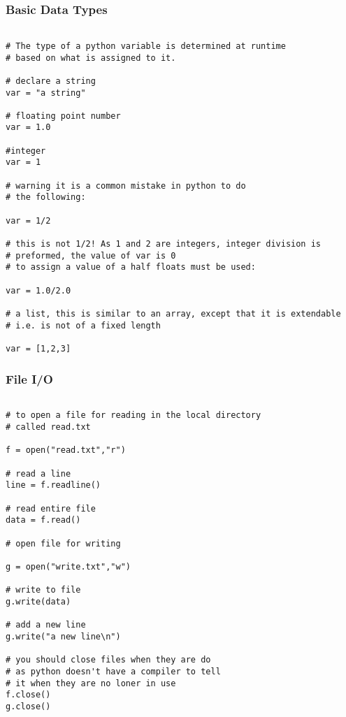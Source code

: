\documentclass[11pt,a4paper]{article}
\begin{document}
\subsubsection{Basic Data Types}
\begin{verbatim}

# The type of a python variable is determined at runtime
# based on what is assigned to it.

# declare a string
var = "a string"

# floating point number
var = 1.0

#integer
var = 1

# warning it is a common mistake in python to do
# the following:

var = 1/2

# this is not 1/2! As 1 and 2 are integers, integer division is
# preformed, the value of var is 0
# to assign a value of a half floats must be used:

var = 1.0/2.0

# a list, this is similar to an array, except that it is extendable
# i.e. is not of a fixed length

var = [1,2,3]

\end{verbatim}

\subsubsection{File I/O}
\begin{verbatim}

# to open a file for reading in the local directory
# called read.txt

f = open("read.txt","r")

# read a line
line = f.readline()

# read entire file
data = f.read()

# open file for writing

g = open("write.txt","w")

# write to file
g.write(data)

# add a new line
g.write("a new line\n")

# you should close files when they are do
# as python doesn't have a compiler to tell
# it when they are no loner in use
f.close()
g.close()

\end{verbatim}
\end{document}
